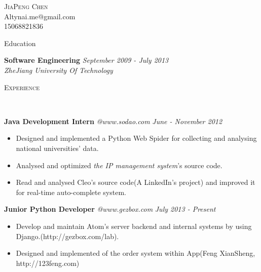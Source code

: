 ﻿\documentclass[9pt]{article}
\newenvironment{changemargin}[2]{%
  \begin{list}{}{%
    \setlength{\topsep}{0pt}%
    \setlength{\leftmargin}{#1}%
    \setlength{\rightmargin}{#2}%
    \setlength{\listparindent}{\parindent}%
    \setlength{\itemindent}{\parindent}%
    \setlength{\parsep}{\parskip}%
  }%
  \item[]}{\end{list}
}
\newcommand{\lineover}{
	\begin{changemargin}{-0.05in}{-0.05in}
		\vspace*{-8pt}
		\hrulefill \\
		\vspace*{-2pt}
	\end{changemargin}
}
\newcommand{\header}[1]{
	\begin{changemargin}{-0.5in}{-0.5in}
		\scshape{#1}\\
  	\lineover
	\end{changemargin}
}
\newcommand{\contact}[4]{
	\begin{changemargin}{-0.5in}{-0.5in}
		\begin{center}
			{\Large \scshape {#1}}\\ \smallskip
			{#2}\\ \smallskip
			{#3}\\ \smallskip
			{#4}\smallskip
		\end{center}
	\end{changemargin}
}
\newenvironment{body} {
	\vspace*{-16pt}
	\begin{changemargin}{-0.25in}{-0.5in}
  }	
	{\end{changemargin}
}
\begin{document}
\contact{JiaPeng Chen}{Altynai.me@gmail.com}{15068821836}

\header{Education}
\begin{body}
	\vspace{14pt}
	\textbf{Software Engineering} \hfill \emph{September 2009 - July 2013} \\
	\emph{ZheJiang University Of Technology}\\
\end{body}

\smallskip

\header{Experience}

\begin{body}
	\vspace{14pt}

	\textbf{Java Development Intern} \emph{@www.sodao.com} \hfill \emph{June - November 2012}\\
	\vspace*{-4pt}
	\begin{itemize} \itemsep -0pt  %
		\item Designed and implemented a Python Web Spider for collecting and analysing national universities' data.
        \item Analysed and optimized \emph{the IP management system}'s source code.
        \item Read and analysed Cleo's source code(A LinkedIn's project) and improved it for real-time auto-complete system.
	\end{itemize}

    \textbf{Junior Python Developer} \emph{@www.gezbox.com} \hfill \emph{July 2013 - Present}\\
    \vspace*{-4pt}
    \begin{itemize} \itemsep -0pt  %
        \item Develop and maintain Atom's server backend and internal systems by using Django.(http://gezbox.com/lab).
        \item Designed and implemented of the order system within App(Feng XianSheng, http://123feng.com)
    \end{itemize}

\end{body}
\end{document}
